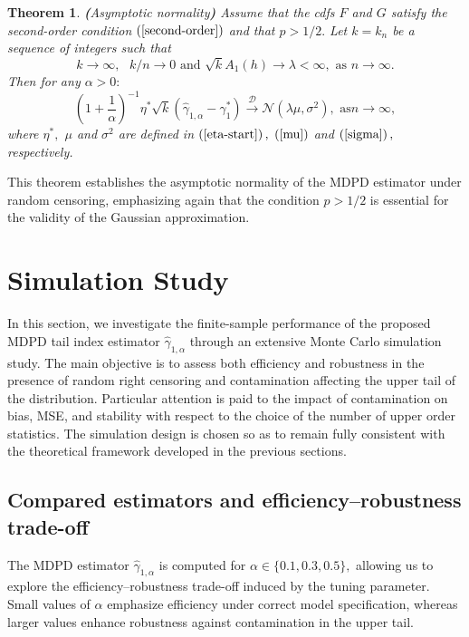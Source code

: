 \documentclass[reqno,openbib,runningheads,a4paper,12pt]{amsart}%
\newtheorem{theorem}{Theorem}[section]
\begin{document}
\begin{theorem}
\textbf{\label{TH2}(}Asymptotic normality\textbf{) }Assume that the cdfs $F$
and $G$ satisfy the second-order condition $\left(  \ref{second-order}\right)
$ and that $p>1/2.$ Let $k=k_{n}$ be a sequence of integers such that
\[
k\rightarrow\infty,\text{ }k/n\rightarrow0\text{ and }\sqrt{k}A_{1}\left(
h\right)  \rightarrow\lambda<\infty,\text{ as }n\rightarrow\infty.
\]
Then for any $\alpha>0:$%
\[
\left(  1+\frac{1}{\alpha}\right)  ^{-1}\eta^{\ast}\sqrt{k}\left(
\widehat{\gamma}_{1,\alpha}-\gamma_{1}^{\ast}\right)  \overset{\mathcal{D}%
}{\rightarrow}\mathcal{N}\left(  \lambda\mu,\sigma^{2}\right)  ,\text{ as
}n\rightarrow\infty,
\]
where $\eta^{\ast},$ $\mu$ and $\sigma^{2}$ are defined in $\left(
\ref{eta-start}\right)  ,$ $\left(  \ref{mu}\right)  $ and $\left(
\ref{sigma}\right)  ,$ respectively.
\end{theorem}

\noindent This theorem establishes the asymptotic normality of the MDPD
estimator under random censoring, emphasizing again that the condition $p>1/2$
is essential for the validity of the Gaussian approximation.

\section{\textbf{Simulation Study}\label{sec4}}

\noindent In this section, we investigate the finite-sample performance of the
proposed MDPD tail index estimator $\widehat{\gamma}_{1,\alpha}$ through an
extensive Monte Carlo simulation study. The main objective is to assess both
efficiency and robustness in the presence of random right censoring and
contamination affecting the upper tail of the distribution. Particular
attention is paid to the impact of contamination on bias, MSE, and stability
with respect to the choice of the number of upper order statistics. The
simulation design is chosen so as to remain fully consistent with the
theoretical framework developed in the previous sections.

\subsection{Compared estimators and efficiency--robustness trade-off}

\noindent The MDPD estimator $\widehat{\gamma}_{1,\alpha}$ is computed for
$\alpha\in\{0.1,0.3,0.5\},$ allowing us to explore the efficiency--robustness
trade-off induced by the tuning parameter. Small values of $\alpha$ emphasize
efficiency under correct model specification, whereas larger values enhance
robustness against contamination in the upper tail.\smallskip
\end{document}
